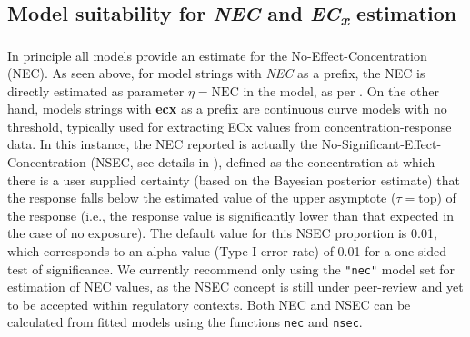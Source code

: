 \documentclass[
  shortnames]{jss}
\begin{document}
\subsection[Model suitability for NEC and ECx estimation]{Model suitability for \textit{NEC} and \textit{EC\textsubscript{x}} estimation}\label{modsuit}

In principle all models provide an estimate for the No-Effect-Concentration (NEC). As seen above, for model strings with \emph{NEC} as a prefix, the NEC is directly estimated as parameter \(\eta = \text{NEC}\) in the model, as per \citep{Fox2010}. On the other hand, models strings with \textbf{ecx} as a prefix are continuous curve models with no threshold, typically used for extracting ECx values from concentration-response data. In this instance, the NEC reported is actually the No-Significant-Effect-Concentration (NSEC, see details in \citet{Fisher2022}), defined as the concentration at which there is a user supplied certainty (based on the Bayesian posterior estimate) that the response falls below the estimated value of the upper asymptote (\(\tau = \text{top}\)) of the response (i.e., the response value is significantly lower than that expected in the case of no exposure). The default value for this NSEC proportion is 0.01, which corresponds to an alpha value (Type-I error rate) of 0.01 for a one-sided test of significance. We currently recommend only using the \texttt{"nec"} model set for estimation of NEC values, as the NSEC concept is still under peer-review and yet to be accepted within regulatory contexts. Both NEC and NSEC can be calculated from fitted models using the functions \texttt{nec} and \texttt{nsec}.
\end{document}
